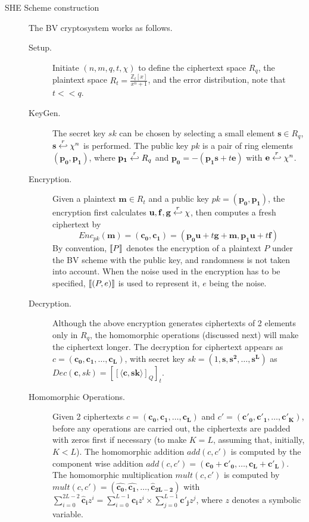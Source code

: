 \begin{description}
\item [SHE Scheme construction]
  \label{sec:BVScheme}
  The BV cryptosystem works as follows.
  \begin{description}
  \item[Setup.] Initiate $(n,m,q,t, \chi)$ to define the ciphertext space $R_q$,
    the plaintext space $R_t = \frac{\mathbb{Z}_{t}[x]}{x^{n} + 1}$, and the
    error distribution, note that \(t << q\).
  \item[KeyGen.] The secret key $sk$ can be chosen by selecting a small element
    $\mathbf{s} \in R_{q}$, $\mathbf{s} \stackrel{r}{\hookleftarrow} \chi^{n}$ is performed. The
    public key $pk$ is a pair of ring elements $(\mathbf{p_0},\mathbf{p_1})$,
    where $\mathbf{p_1} \stackrel{r}{\hookleftarrow} R_q$ and
    $\mathbf{p_0} = -(\mathbf{p_1}\mathbf{s} + t\mathbf{e})$ with
    $\mathbf{e} \stackrel{r}{\hookleftarrow} \chi^{n}$.
  \item[Encryption.] Given a plaintext $\mathbf{m} \in R_t$ and a public key
    $pk=(\mathbf{p_0},\mathbf{p_1})$, the encryption first calculates
    $\mathbf{u},\mathbf{f},\mathbf{g} \stackrel{r}{\hookleftarrow} \chi$, then computes a fresh
    ciphertext by
    \[
      Enc_{pk}(\mathbf{m}) = (\mathbf{c_0},\mathbf{c_1}) =
      (\mathbf{p_0}\mathbf{u} + t\mathbf{g} + \mathbf{m},
      \mathbf{p_1}\mathbf{u} + t\mathbf{f})
    \]
    By convention, $\left\llbracket P\right\rrbracket$ denotes the encryption of a plaintext $P$
    under the BV scheme with the public key, and randomness is not taken into account. When the noise used in the encryption has to be specified,
    $\left\llbracket(P,e)\right\rrbracket$ is used to represent it, $e$ being the noise.
  \item[Decryption.] Although the above encryption generates ciphertexts of 2
    elements only in $R_q$, the homomorphic operations (discussed next) will
    make the ciphertext longer. The decryption for ciphertext appears as
    $c=(\mathbf{c_0},\mathbf{c_1},\dots,\mathbf{c_L})$, with secret key
    $sk = (1, \mathbf{s}, \mathbf{s^2},\dots, \mathbf{s^L})$ as
    $ Dec(\mathbf{c},sk) = \left[\left[ \langle \mathbf{c}, \mathbf{sk} \rangle
      \right]_Q \right]_t $.
  \item[Homomorphic Operations.] Given 2 ciphertexts
    $c = (\mathbf{c_0},\mathbf{c_1},\dots,\mathbf{c_L})$ and
    $c' = (\mathbf{c'_0},\mathbf{c'_1},\dots,\mathbf{c'_{K}})$, before any
    operations are carried out, the ciphertexts are padded with zeros first if necessary (to
    make $K = L$, assuming that, initially, $K < L$).  The homomorphic addition
    $add(c,c')$ is computed by the component wise addition
    $add(c,c') = (\mathbf{c_0} +\mathbf{c'_0}, \dots,
    \mathbf{c_L}+\mathbf{c'_L})$. The homomorphic multiplication $mult(c,c')$ is
    computed by
    $mult(c,c') = (\mathbf{\hat{c_0}}, \mathbf{\hat{c_1}}, \dots,
    \mathbf{\hat{c}_{2L-2}})$ with
    $ \sum_{i=0}^{2L-2}\mathbf{\hat{c}_i}z^i = \sum_{i=0}^{L-1}\mathbf{c_i}z^i
    \times \sum_{j=0}^{L-1}\mathbf{c'_j}z^j $, where $z$ denotes a symbolic
    variable.

  \end{description}

\end{description}
